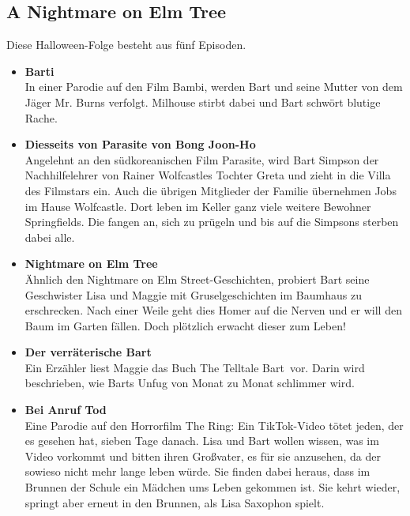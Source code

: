 \subsection{A Nightmare on Elm Tree}
Diese Halloween-Folge besteht aus fünf Episoden.
\begin{itemize}
  \item \textbf{Barti}\\ In einer Parodie auf den Film \glqq Bambi\grqq, werden Bart und seine Mutter von dem Jäger Mr. Burns verfolgt. Milhouse stirbt dabei und Bart schwört blutige Rache.
  \item \textbf{Diesseits von Parasite von Bong Joon-Ho}\\ Angelehnt an den südkoreanischen Film \glqq Parasite\grqq, wird Bart Simpson der Nachhilfelehrer von Rainer Wolfcastles Tochter Greta und zieht in die Villa des Filmstars ein. Auch die übrigen Mitglieder der Familie übernehmen Jobs im Hause Wolfcastle. Dort leben im Keller ganz viele weitere Bewohner Springfields. Die fangen an, sich zu prügeln und bis auf die Simpsons sterben dabei alle.
  \item \textbf{Nightmare on Elm Tree}\\  Ähnlich den \glqq Nightmare on Elm Street\grqq -Geschichten, probiert Bart seine Geschwister Lisa und Maggie mit Gruselgeschichten im Baumhaus zu erschrecken. Nach einer Weile geht dies Homer auf die Nerven und er will den Baum im Garten fällen. Doch plötzlich erwacht dieser zum Leben!
  \item \textbf{Der verräterische Bart}\\ Ein Erzähler liest Maggie das Buch \glqq The Telltale Bart\grqq\ vor. Darin wird beschrieben, wie Barts Unfug von Monat zu Monat schlimmer wird.
  \item \textbf{Bei Anruf Tod}\\ Eine Parodie auf den Horrorfilm \glqq The Ring\grqq : Ein TikTok-Video tötet jeden, der es gesehen hat, sieben Tage danach. Lisa und Bart wollen wissen, was im Video vorkommt und bitten ihren Großvater, es für sie anzusehen, da der sowieso nicht mehr lange leben würde. Sie finden dabei heraus, dass im Brunnen der Schule ein Mädchen ums Leben gekommen ist. Sie kehrt wieder, springt aber erneut in den Brunnen, als Lisa Saxophon spielt. 
\end{itemize}


